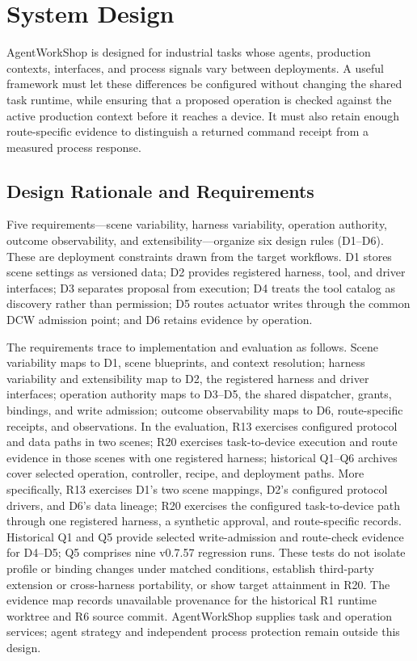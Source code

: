\section{System Design}
\label{sec:design}
AgentWorkShop is designed for industrial tasks whose agents, production
contexts, interfaces, and process signals vary between deployments. A useful
framework must let these differences be configured without changing the
shared task runtime, while ensuring that a proposed operation is checked
against the active production context before it reaches a device. It must also
retain enough route-specific evidence to distinguish a returned command
receipt from a measured process response.

\subsection{Design Rationale and Requirements}
\label{sec:principles}
Five requirements---scene variability, harness variability, operation
authority, outcome observability, and extensibility---organize six design
rules (D1--D6). These are deployment constraints drawn from the target
workflows. D1 stores scene settings as versioned data;
D2 provides registered harness, tool, and driver interfaces; D3 separates
proposal from execution; D4 treats the tool catalog as discovery rather than
permission; D5 routes actuator writes through the common DCW admission point;
and D6 retains evidence by operation.

The requirements trace to implementation and evaluation as follows.
Scene variability maps to D1, scene blueprints, and context resolution;
harness variability and extensibility map to D2, the registered harness and
driver interfaces; operation authority maps to D3--D5, the shared dispatcher,
grants, bindings, and write admission; outcome observability maps to D6,
route-specific receipts, and observations. In the evaluation, R13 exercises
configured protocol and data paths in two scenes; R20 exercises task-to-device
execution and route evidence in those scenes with one registered harness;
historical Q1--Q6 archives cover selected operation, controller, recipe, and
deployment paths. More specifically, R13 exercises D1's two scene mappings,
D2's configured protocol drivers, and D6's data lineage; R20 exercises the
configured task-to-device path through one registered harness, a synthetic
approval, and route-specific records. Historical Q1 and Q5 provide selected
write-admission and route-check evidence for D4--D5; Q5 comprises nine
v0.7.57 regression runs. These tests do not isolate profile or binding changes
under matched conditions, establish third-party extension or cross-harness
portability, or show target attainment in R20. The evidence map records
unavailable provenance for the historical R1 runtime worktree and R6 source
commit. AgentWorkShop supplies task and operation services; agent strategy
and independent process protection remain outside this design.

